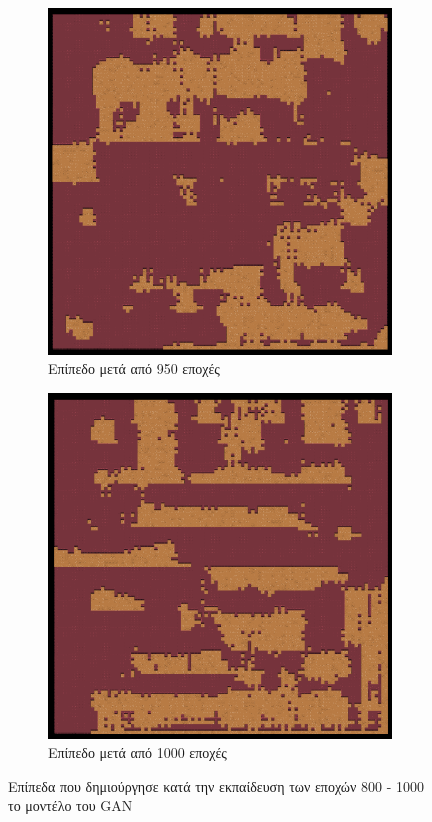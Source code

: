 \begin{figure}[H]
\begin{subfigure}{.5\textwidth}
  \centering
  \includegraphics[width=.8\linewidth]{../images/generated/950.png}
  \caption{Επίπεδο μετά από 950 εποχές}
  \label{fig:sfig2}
\end{subfigure}
\begin{subfigure}{.5\textwidth}
  \centering
  \includegraphics[width=.8\linewidth]{../images/generated/1000.png}
  \caption{Επίπεδο μετά από 1000 εποχές}
  \label{fig:sfig2}
\end{subfigure}
\caption{Επίπεδα που δημιούργησε κατά την εκπαίδευση των εποχών 800 - 1000 το μοντέλο του GAN}
\label{fig:fig}
\end{figure}

